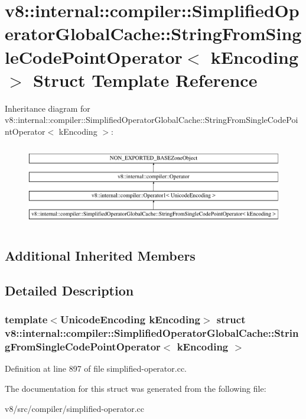 \hypertarget{structv8_1_1internal_1_1compiler_1_1SimplifiedOperatorGlobalCache_1_1StringFromSingleCodePointOperator}{}\section{v8\+:\+:internal\+:\+:compiler\+:\+:Simplified\+Operator\+Global\+Cache\+:\+:String\+From\+Single\+Code\+Point\+Operator$<$ k\+Encoding $>$ Struct Template Reference}
\label{structv8_1_1internal_1_1compiler_1_1SimplifiedOperatorGlobalCache_1_1StringFromSingleCodePointOperator}
Inheritance diagram for v8\+:\+:internal\+:\+:compiler\+:\+:Simplified\+Operator\+Global\+Cache\+:\+:String\+From\+Single\+Code\+Point\+Operator$<$ k\+Encoding $>$\+:\begin{figure}[H]
\begin{center}
\leavevmode
\includegraphics[height=3.642277cm]{structv8_1_1internal_1_1compiler_1_1SimplifiedOperatorGlobalCache_1_1StringFromSingleCodePointOperator}
\end{center}
\end{figure}
\subsection*{Additional Inherited Members}


\subsection{Detailed Description}
\subsubsection*{template$<$Unicode\+Encoding k\+Encoding$>$\newline
struct v8\+::internal\+::compiler\+::\+Simplified\+Operator\+Global\+Cache\+::\+String\+From\+Single\+Code\+Point\+Operator$<$ k\+Encoding $>$}



Definition at line 897 of file simplified-\/operator.\+cc.



The documentation for this struct was generated from the following file\+:\begin{DoxyCompactItemize}
\item 
v8/src/compiler/simplified-\/operator.\+cc\end{DoxyCompactItemize}
